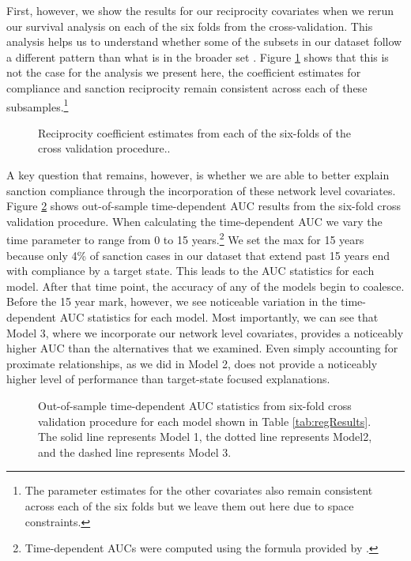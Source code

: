 First, however, we show the results for our reciprocity covariates when we rerun our survival analysis on each of the six folds from the cross-validation. This analysis helps us to understand whether some of the subsets in our dataset follow a different pattern than what is in the broader set \citep{beck2008time}. Figure \ref{fig:crossval} shows that this is not the case for the analysis we present here, the coefficient estimates for compliance and sanction reciprocity remain consistent across each of these subsamples.\footnote{The parameter estimates for the other covariates also remain consistent across each of the six folds but we leave them out here due to space constraints.}

\begin{figure}[ht]
	\centering
	\caption{Reciprocity coefficient estimates from each of the six-folds of the cross validation procedure..}
	\resizebox{1\textwidth}{!}{}
	\label{fig:crossval}
\end{figure}
\FloatBarrier

A key question that remains, however, is whether we are able to better explain sanction compliance through the incorporation of these network level covariates. Figure \ref{fig:auc} shows out-of-sample time-dependent AUC results from the six-fold cross validation procedure. When calculating the time-dependent AUC we vary the time parameter to range from 0 to 15 years.\footnote{Time-dependent AUCs were computed using the formula provided by \citet{chambless2006estimation}.} We set the max for 15 years because only 4\% of sanction cases in our dataset that extend past 15 years end with compliance by a target state. This leads to the AUC statistics for each model. After that time point, the accuracy of any of the models begin to coalesce. Before the 15 year mark, however, we see noticeable variation in the time-dependent AUC statistics for each model. Most importantly, we can see that Model 3, where we incorporate our network level covariates, provides a noticeably higher AUC than the alternatives that we examined. Even simply accounting for proximate relationships, as we did in Model 2, does not provide a noticeably higher level of performance than target-state focused explanations.

\begin{figure}[ht]
	\centering
	\caption{Out-of-sample time-dependent AUC statistics from six-fold cross validation procedure for each model shown in Table \ref{tab:regResults}. The solid line represents Model 1, the dotted line represents Model2, and the dashed line represents Model 3.}
	\resizebox{0.8\textwidth}{!}{}
	\label{fig:auc}
\end{figure}
\FloatBarrier